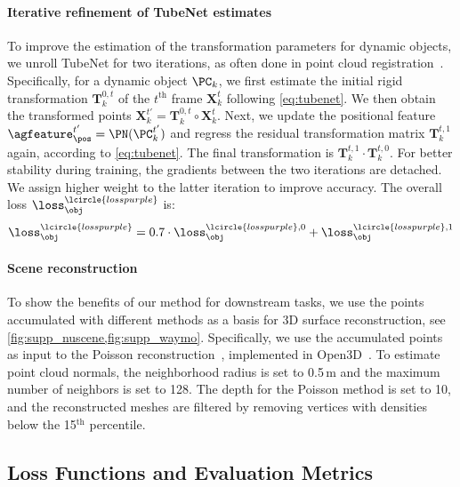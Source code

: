 \paragraph{Iterative refinement of TubeNet estimates}
To improve the estimation of the transformation parameters for dynamic objects, we unroll TubeNet for two iterations, as often done in point cloud registration~\cite{yew2020rpm,gojcic2020multiview}. Specifically, for a dynamic object $\PC_k$, we first estimate the initial rigid transformation $\mathbf{T}_k^{0, t}$ of the $t^\text{th}$ frame $\mathbf{X}_k^t$ following \cref{eq:tubenet}. We then obtain the transformed points $\mathbf{X}_k^{t'} = \mathbf{T}_k^{0, t} \circ \mathbf{X}_k^t$. Next, we update the positional feature $\agfeature_\pos^{t'} = \PN(\PC_k^{t'})$ and regress the residual transformation matrix $\mathbf{T}_k^{t, 1}$ again, according to \cref{eq:tubenet}. The final transformation is $\mathbf{T}_k^{t, 1}\cdot\mathbf{T}_k^{t, 0}$. For better stability during training, the gradients between the two iterations are detached. We assign higher weight to the latter iteration to improve accuracy. The overall loss $\loss_\obj^\lcircle{losspurple}$ is:
\begin{equation}
    \loss_\obj^\lcircle{losspurple} = 0.7\cdot \loss_\obj^{\lcircle{losspurple},0} +  \loss_\obj^{\lcircle{losspurple},1}
\end{equation}

\paragraph{Scene reconstruction}
To show the benefits of our method for downstream tasks, we use the points accumulated with different methods as a basis for 3D surface reconstruction, see \cref{fig:supp_nuscene,fig:supp_waymo}. Specifically, we use the accumulated points as input to the Poisson reconstruction~\cite{kazhdan2006poisson}, implemented in Open3D~\cite{Zhou2018}. To estimate point cloud normals, the neighborhood radius is set to 0.5$\,$m and the maximum number of neighbors is set to 128. The depth for the Poisson method is set to 10, and the reconstructed meshes are filtered by removing vertices with densities below the 15$^\text{th}$ percentile. 

\subsection{Loss Functions and Evaluation Metrics}
\label{sec:supp_loss}
